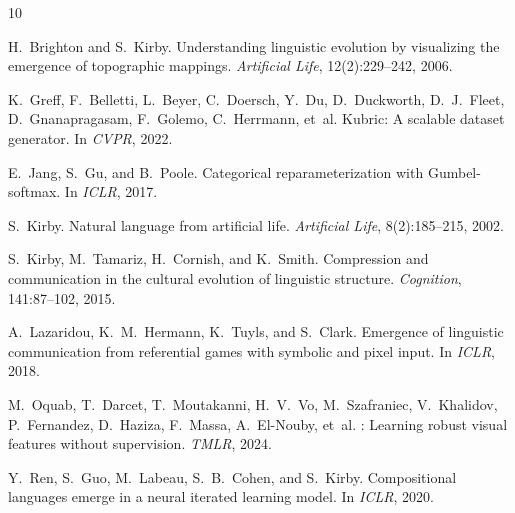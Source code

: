 \documentclass[11pt,a4paper]{article}
\begin{document}

\begin{thebibliography}{10}

H.~Brighton and S.~Kirby.
\newblock Understanding linguistic evolution by visualizing the emergence of topographic mappings.
\newblock \emph{Artificial Life}, 12(2):229--242, 2006.

K.~Greff, F.~Belletti, L.~Beyer, C.~Doersch, Y.~Du, D.~Duckworth, D.~J.~Fleet, D.~Gnanapragasam, F.~Golemo, C.~Herrmann, et~al.
\newblock Kubric: A scalable dataset generator.
\newblock In \emph{CVPR}, 2022.

E.~Jang, S.~Gu, and B.~Poole.
\newblock Categorical reparameterization with {G}umbel-softmax.
\newblock In \emph{ICLR}, 2017.

S.~Kirby.
\newblock Natural language from artificial life.
\newblock \emph{Artificial Life}, 8(2):185--215, 2002.

S.~Kirby, M.~Tamariz, H.~Cornish, and K.~Smith.
\newblock Compression and communication in the cultural evolution of linguistic structure.
\newblock \emph{Cognition}, 141:87--102, 2015.

A.~Lazaridou, K.~M.~Hermann, K.~Tuyls, and S.~Clark.
\newblock Emergence of linguistic communication from referential games with symbolic and pixel input.
\newblock In \emph{ICLR}, 2018.

M.~Oquab, T.~Darcet, T.~Moutakanni, H.~V.~Vo, M.~Szafraniec, V.~Khalidov, P.~Fernandez, D.~Haziza, F.~Massa, A.~El-Nouby, et~al.
: Learning robust visual features without supervision.
\newblock \emph{TMLR}, 2024.

Y.~Ren, S.~Guo, M.~Labeau, S.~B.~Cohen, and S.~Kirby.
\newblock Compositional languages emerge in a neural iterated learning model.
\newblock In \emph{ICLR}, 2020.

\end{thebibliography}
\end{document}
